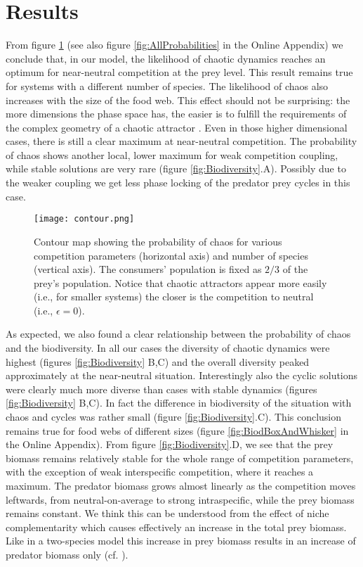 \section{Results}
\label{sec:Results}
From figure \ref{fig:Contour} (see also figure \ref{fig:AllProbabilities} in the Online Appendix) we conclude that, in our model, the likelihood of chaotic dynamics reaches an optimum for near-neutral competition at the prey level. This result remains true for systems with a different number of species. The likelihood of chaos also increases with the size of the food web. This effect should not be surprising: the more dimensions the phase space has, the easier is to fulfill the requirements of the complex geometry of a chaotic attractor \citep{Strogatz1994}. Even in those higher dimensional cases, there is still a clear maximum at near-neutral competition. The probability of chaos shows another local, lower maximum for weak competition coupling, while stable solutions are very rare (figure \ref{fig:Biodiversity}.A). Possibly due to the weaker coupling we get less phase locking of the predator prey cycles in this case.  

\begin{figure}
	\begin{center}
		\texttt{[image: contour.png]}
	\end{center}
	\caption{Contour map showing the probability of chaos for various competition parameters (horizontal axis) and number of species (vertical axis). The consumers' population is fixed as $ 2/3 $ of the prey's population. Notice that chaotic attractors appear more easily (i.e., for smaller systems) the closer is the competition to neutral (i.e., $ \epsilon = 0 $).}
	\label{fig:Contour}
\end{figure}

As expected, we also found a clear relationship between the probability of chaos and the biodiversity. In all our cases the diversity of chaotic dynamics were highest (figures \ref{fig:Biodiversity} B,C) and the overall diversity peaked approximately at the near-neutral situation. Interestingly also the cyclic solutions were clearly much more diverse than cases with stable dynamics (figures \ref{fig:Biodiversity} B,C). In fact the difference in biodiversity of the situation with chaos and cycles was rather small (figure \ref{fig:Biodiversity}.C). This conclusion remains true for food webs of different sizes (figure \ref{fig:BiodBoxAndWhisker} in the Online Appendix). From figure \ref{fig:Biodiversity}.D, we see that the prey biomass remains relatively stable for the whole range of competition parameters, with the exception of weak interspecific competition, where it reaches a maximum. The predator biomass grows almost linearly as the competition moves leftwards, from neutral-on-average to strong intraspecific, while the prey biomass remains constant. We think this can be understood from the effect of niche complementarity which causes effectively an increase in the total prey biomass. Like in a two-species model this increase in prey biomass results in an increase of predator biomass only (cf. \citet{Rosenzweig1963}).

